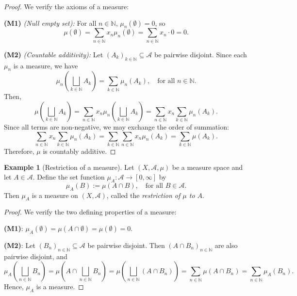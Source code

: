 \documentclass{article}
\theoremstyle{definition}
\newtheorem{example}{Example}[section]
\begin{document}
\begin{proof}
We verify the axioms of a measure:

\textbf{(M1)} \emph{(Null empty set):} For all \( n \in \mathbb{N} \), \( \mu_n(\emptyset) = 0 \), so
\[
\mu(\emptyset) = \sum_{n \in \mathbb{N}} x_n \mu_n(\emptyset) = \sum_{n \in \mathbb{N}} x_n \cdot 0 = 0.
\]

\textbf{(M2)} \emph{(Countable additivity):} Let \( (A_k)_{k \in \mathbb{N}} \subseteq \mathcal{A} \) be pairwise disjoint. Since each \( \mu_n \) is a measure, we have
\[
\mu_n\left( \bigsqcup_{k \in \mathbb{N}} A_k \right) = \sum_{k \in \mathbb{N}} \mu_n(A_k), \quad \text{for all } n \in \mathbb{N}.
\]
Then,
\[
\mu\left( \bigsqcup_{k \in \mathbb{N}} A_k \right)
= \sum_{n \in \mathbb{N}} x_n \mu_n\left( \bigsqcup_{k \in \mathbb{N}} A_k \right)
= \sum_{n \in \mathbb{N}} x_n \sum_{k \in \mathbb{N}} \mu_n(A_k).
\]
Since all terms are non-negative, we may exchange the order of summation:
\[
\sum_{n \in \mathbb{N}} x_n \sum_{k \in \mathbb{N}} \mu_n(A_k)
= \sum_{k \in \mathbb{N}} \sum_{n \in \mathbb{N}} x_n \mu_n(A_k)
= \sum_{k \in \mathbb{N}} \mu(A_k).
\]
Therefore, \( \mu \) is countably additive.
\end{proof}


\medskip
\begin{example}[Restriction of a measure]
Let \((X, \mathcal{A}, \mu)\) be a measure space and let \(A \in \mathcal{A}\). Define the set function \(\mu_{\!A} : \mathcal{A} \to [0, \infty]\) by
\[
\mu_{\!A}(B) := \mu(A \cap B), \quad \text{for all } B \in \mathcal{A}.
\]
Then \(\mu_{\!A}\) is a measure on \((X, \mathcal{A})\), called the \emph{restriction of \(\mu\) to \(A\)}.
\end{example}

\begin{proof}
We verify the two defining properties of a measure:

\textbf{(M1)}: \(\mu_{\!A}(\emptyset) = \mu(A \cap \emptyset) = \mu(\emptyset) = 0\).

\medskip
\textbf{(M2)}: Let \((B_n)_{n \in \mathbb{N}} \subseteq \mathcal{A}\) be pairwise disjoint. Then \((A \cap B_n)_{n \in \mathbb{N}}\) are also pairwise disjoint, and
\[
\mu_{\!A}\left( \bigsqcup_{n \in \mathbb{N}} B_n \right)
= \mu\left( A \cap \bigsqcup_{n \in \mathbb{N}} B_n \right)
= \mu\left( \bigsqcup_{n \in \mathbb{N}} (A \cap B_n) \right)
= \sum_{n \in \mathbb{N}} \mu(A \cap B_n)
= \sum_{n \in \mathbb{N}} \mu_{\!A}(B_n).
\]
Hence, \(\mu_{\!A}\) is a measure.
\end{proof}
\end{document}
